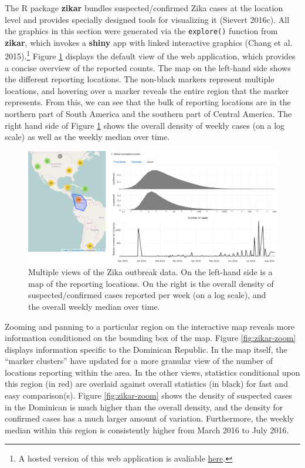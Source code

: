 \documentclass[12pt,]{article}
\let\rmarkdownfootnote\footnote%
\def\footnote{\protect\rmarkdownfootnote}
\theoremstyle{definition}
\theoremstyle{definition}
\theoremstyle{remark}
\begin{document}
The R package \textbf{zikar} bundles suspected/confirmed Zika cases at
the location level and provides specially designed tools for visualizing
it (Sievert 2016c). All the graphics in this section were generated via
the \texttt{explore()} function from \textbf{zikar}, which invokes a
\textbf{shiny} app with linked interactive graphics (Chang et al.
2015).\footnote{A hosted version of this web application is avaliable
  \href{http://104.131.111.111:3838/zikar/}{here}.} Figure
\ref{fig:zikar} displays the default view of the web application, which
provides a concise overview of the reported counts. The map on the
left-hand side shows the different reporting locations. The non-black
markers represent multiple locations, and hovering over a marker reveals
the entire region that the marker represents. From this, we can see that
the bulk of reporting locations are in the northern part of South
America and the southern part of Central America. The right hand side of
Figure \ref{fig:zikar} shows the overall density of weekly cases (on a
log scale) as well as the weekly median over time.

\begin{figure}
\centering
\includegraphics{images/zikar}
\caption{\label{fig:zikar}Multiple views of the Zika outbreak data. On the
left-hand side is a map of the reporting locations. On the right is the
overall density of suspected/confirmed cases reported per week (on a log
scale), and the overall weekly median over time.}
\end{figure}

Zooming and panning to a particular region on the interactive map
reveals more information conditioned on the bounding box of the map.
Figure \ref{fig:zikar-zoom} displays information specific to the
Dominican Republic. In the map itself, the ``marker clusters'' have
updated for a more granular view of the number of locations reporting
within the area. In the other views, statistics conditional upon this
region (in red) are overlaid against overall statistics (in black) for
fast and easy comparison(s). Figure \ref{fig:zikar-zoom} shows the
density of suspected cases in the Dominican is much higher than the
overall density, and the density for confirmed cases has a much larger
amount of variation. Furthermore, the weekly median within this region
is consistently higher from March 2016 to July 2016.
\end{document}
